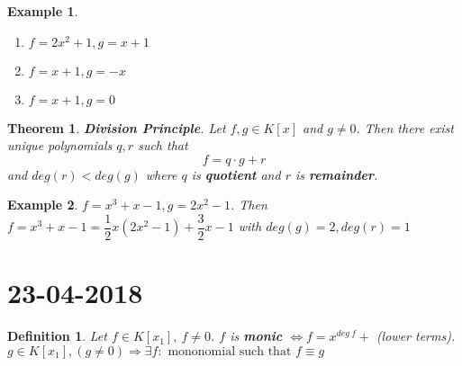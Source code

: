 \documentclass[a4paper,10pt]{article}
\newtheorem{theo}{Theorem}
\newtheorem{defi}{Definition}
\newtheorem{ex}{Example}
\begin{document}
\begin{ex}
	\begin{enumerate}
		\item $ f=2x^2 +1 , g =x+1 $
		\item  $ f=x+1, g=-x $
		\item  $ f=x+1, g =0 $
	\end{enumerate}
\end{ex}

\begin{theo}
	\textbf{Division Principle}. Let $ f,g \in K[x] $ and $ g \neq 0 $. Then there exist unique polynomials $ q,r $ such that
	\[ f= q \cdot g + r  \] and $ deg(r) < deg(g) $ where $ q $ is \textbf{quotient} and $ r $ is \textbf{remainder}.
\end{theo}

\begin{ex}
	$ f = x^3 +x -1 , g =2x^2 -1 $. Then $ f = x^3+x-1 = \dfrac{1}{2} x (2x^2-1) + \dfrac{3}{2}x -1 $ with $ deg(g)=2 , deg(r)=1 $
\end{ex}

\newpage
\section{23-04-2018}

\begin{defi}
	Let $ f \in K[x_{1}] , \  f\neq 0 $. $ f $ is \textbf{monic} $ \Leftrightarrow f = x^{deg \ f} + $ (lower terms).\\
	$ g \in K[x_{1}], (g\neq 0) \Rightarrow \exists f : \text{ mononomial such that } f \equiv g $
\end{defi}
\end{document}
